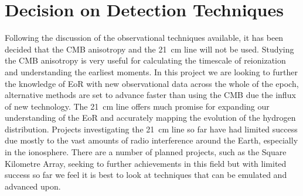 
\section{Decision on Detection Techniques} %
\label{sec:decision_on_detection_techniques}
	Following the discussion of the observational techniques available, it has been decided that the CMB anisotropy and the \SI{21}{\centi\metre} line will not be used. Studying the CMB anisotropy is very useful for calculating the timescale of reionization and understanding the earliest moments. In this project we are looking to further the knowledge of EoR with new observational data across the whole of the epoch, alternative methods are set to advance faster than using the CMB due the influx of new technology. The \SI{21}{\centi\metre} line offers much promise for expanding our understanding of the EoR and accurately mapping the evolution of the hydrogen distribution. Projects investigating the \SI{21}{\centi\metre} line so far have had limited success due mostly to the vast amounts of radio interference around the Earth, especially in the ionosphere. There are a number of planned projects, such as the Square Kilometre Array, seeking to further achievements in this field but with limited success so far we feel it is best to look at techniques that can be emulated and advanced upon.

